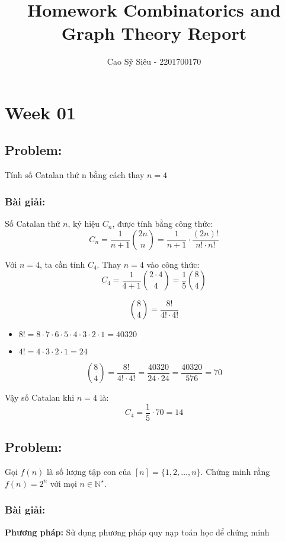 \documentclass[a4paper,12pt]{article}
\title{Homework Combinatorics and Graph Theory Report}
\author{Cao Sỹ Siêu - 2201700170}
\date{ }
\begin{document}
\maketitle


\newpage

\section*{Week 01}
\subsection*{Problem:}
Tính số Catalan thứ n bằng cách thay $n = 4$
\subsubsection*{Bài giải:}

Số Catalan thứ \( n \), ký hiệu \( C_n \), được tính bằng công thức:
\[
C_n = \frac{1}{n+1} \binom{2n}{n} = \frac{1}{n+1} \cdot \frac{(2n)!}{n! \cdot n!}
\]

Với \( n = 4 \), ta cần tính \( C_4 \).
Thay \( n = 4 \) vào công thức:
\[
C_4 = \frac{1}{4+1} \binom{2 \cdot 4}{4} = \frac{1}{5} \binom{8}{4}
\]

\[
\binom{8}{4} = \frac{8!}{4! \cdot 4!}
\]

\begin{itemize}
    \item \( 8! = 8 \cdot 7 \cdot 6 \cdot 5 \cdot 4 \cdot 3 \cdot 2 \cdot 1 = 40320 \)
    \item \( 4! = 4 \cdot 3 \cdot 2 \cdot 1 = 24 \)
\end{itemize}
\[
\binom{8}{4} = \frac{8!}{4! \cdot 4!} = \frac{40320}{24 \cdot 24} = \frac{40320}{576} = 70
\]

Vậy số Catalan khi \(n=4\) là:
\[
C_4 = \frac{1}{5} \cdot 70 = 14
\]

\subsection*{Problem:}
Gọi $f(n)$ là số lượng tập con của $[n] = \{1, 2, \dots, n\}$. Chứng minh rằng $f(n) = 2^n$ với mọi $n \in \mathbb{N}^\star$.

\subsubsection*{Bài giải:}
\textbf{Phương pháp:} Sử dụng phương pháp quy nạp toán học để chứng minh
\end{document}
